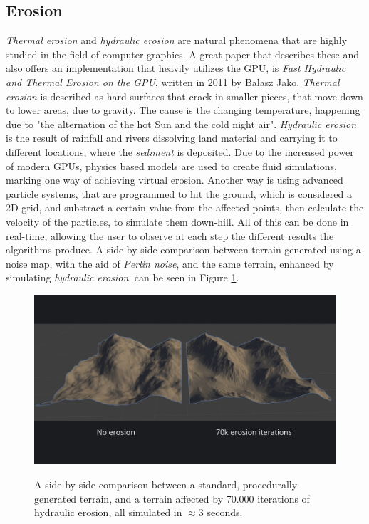 \subsection{Erosion}

\textit{Thermal erosion} and \textit{hydraulic erosion} are natural phenomena that are highly studied in the field of computer graphics. A great paper that describes these and also offers an implementation that heavily utilizes the GPU, is \textit{Fast Hydraulic and Thermal Erosion on the GPU}, written in 2011 by Balasz Jako\cite{jako2011fast}. \textit{Thermal erosion} is described as hard surfaces that crack in smaller pieces, that move down to lower areas, due to gravity. The cause is the changing temperature, happening due to "the alternation of the hot Sun and the cold night air". \textit{Hydraulic erosion} is the result of rainfall and rivers dissolving land material and carrying it to different locations, where the \textit{sediment} is deposited. Due to the increased power of modern GPUs, physics based models are used to create fluid simulations, marking one way of achieving virtual erosion. Another way is using advanced particle systems, that are programmed to hit the ground, which is considered a 2D grid, and substract a certain value from the affected points, then calculate the velocity of the particles, to simulate them down-hill. All of this can be done in real-time, allowing the user to observe at each step the different results the algorithms produce. A side-by-side comparison between terrain generated using a noise map, with the aid of \textit{Perlin noise}, and the same terrain, enhanced by simulating \textit{hydraulic erosion}, can be seen in Figure \ref{fig:hydraulicErosion}.

\begin{figure}[htp]
    \centering
    \includegraphics[width = 16cm]{figures/hydraulicErosion.png}
    \caption{A side-by-side comparison between a standard, procedurally generated terrain, and a terrain affected by 70.000 iterations of hydraulic erosion, all simulated in $\approx$3 seconds.}
    \cite{hydraulicErosion}
    \label{fig:hydraulicErosion}
\end{figure}

